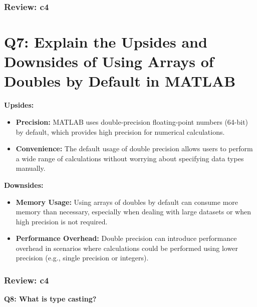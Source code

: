\documentclass[
	11pt, %
]{beamer}
\begin{document}

\begin{frame}
	\frametitle{Review: c4}

\section*{\textbf{Q7: Explain the Upsides and Downsides of Using Arrays of Doubles by Default in MATLAB}}

\textbf{Upsides:}

\begin{itemize}
    \item \textbf{Precision:} 
    MATLAB uses double-precision floating-point numbers (64-bit) by default, which provides high precision for numerical calculations.
    
    \item \textbf{Convenience:} 
    The default usage of double precision allows users to perform a wide range of calculations without worrying about specifying data types manually.
\end{itemize}

\textbf{Downsides:}

\begin{itemize}
    \item \textbf{Memory Usage:} 
    Using arrays of doubles by default can consume more memory than necessary, especially when dealing with large datasets or when high precision is not required.

    \item \textbf{Performance Overhead:} 
    Double precision can introduce performance overhead in scenarios where calculations could be performed using lower precision (e.g., single precision or integers).
\end{itemize}


\end{frame}


\begin{frame}
	\frametitle{Review: c4}

	\textbf{Q8: What is type casting?}

\end{frame}

\end{document}

